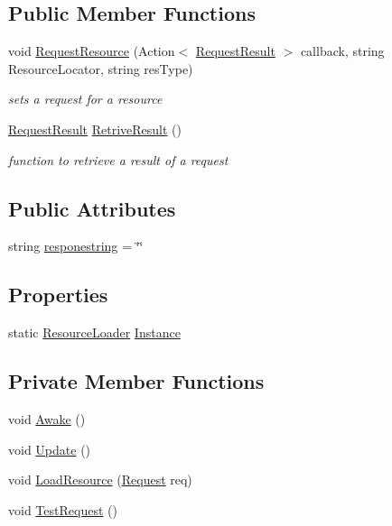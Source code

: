 \subsection*{Public Member Functions}
\begin{DoxyCompactItemize}
\item 
void \mbox{\hyperlink{class_resource_loader_a901b6c5f5391cb35d69d0917ea4a2b5a}{Request\+Resource}} (Action$<$ \mbox{\hyperlink{struct_resource_loader_1_1_request_result}{Request\+Result}} $>$ callback, string Resource\+Locator, string res\+Type)
\begin{DoxyCompactList}\small\item\em sets a request for a resource \end{DoxyCompactList}\item 
\mbox{\hyperlink{struct_resource_loader_1_1_request_result}{Request\+Result}} \mbox{\hyperlink{class_resource_loader_ae0f219fead6e05415dc2523529d81561}{Retrive\+Result}} ()
\begin{DoxyCompactList}\small\item\em function to retrieve a result of a request \end{DoxyCompactList}\end{DoxyCompactItemize}
\subsection*{Public Attributes}
\begin{DoxyCompactItemize}
\item 
string \mbox{\hyperlink{class_resource_loader_adeb4ddafee015e2630ed66e26ec4a4ae}{responestring}} = \char`\"{}\char`\"{}
\end{DoxyCompactItemize}
\subsection*{Properties}
\begin{DoxyCompactItemize}
\item 
static \mbox{\hyperlink{class_resource_loader}{Resource\+Loader}} \mbox{\hyperlink{class_resource_loader_a66d4b7f32938dad50d13f48e362b7b76}{Instance}}
\end{DoxyCompactItemize}
\subsection*{Private Member Functions}
\begin{DoxyCompactItemize}
\item 
void \mbox{\hyperlink{class_resource_loader_ad258acc6c5c963d5ca93dbe36e243d20}{Awake}} ()
\item 
void \mbox{\hyperlink{class_resource_loader_a20a1036648a453863c96b51d33edfa11}{Update}} ()
\item 
void \mbox{\hyperlink{class_resource_loader_a088ef33ee82be6e64028b6b5512fad5d}{Load\+Resource}} (\mbox{\hyperlink{struct_resource_loader_1_1_request}{Request}} req)
\item 
void \mbox{\hyperlink{class_resource_loader_a39eb6b54c79c44d103b0aedfcdc69f81}{Test\+Request}} ()
\end{DoxyCompactItemize}

